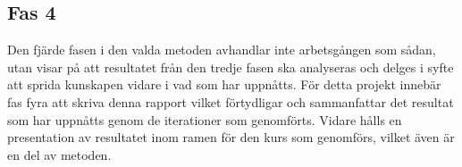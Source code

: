 

    \subsection{Fas 4} %
    \label{sub:fas_4}
        Den fjärde fasen i den valda metoden avhandlar inte arbetsgången som sådan, utan visar på att resultatet från den tredje fasen ska analyseras och delges i syfte att sprida kunskapen vidare i vad som har uppnåtts. 
        För detta projekt innebär fas fyra att skriva denna rapport vilket förtydligar och sammanfattar det resultat som har uppnåtts genom de iterationer som genomförts. Vidare hålls en presentation av resultatet inom ramen för den kurs som genomförs, vilket även är en del av metoden.
